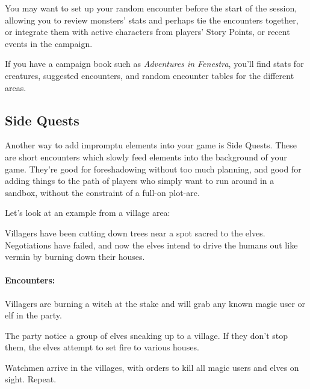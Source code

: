 \begin{multicols}{2}
You may want to set up your random encounter before the start of the session, allowing you to review monsters' stats and perhaps tie the encounters together, or integrate them with active characters from players' Story Points, or recent events in the campaign.

If you have a campaign book such as \textit{Adventures in Fenestra}, you'll find stats for creatures, suggested encounters, and random encounter tables for the different areas.

\subsection{Side Quests}\label{sidequests}

Another way to add impromptu elements into your game is Side Quests.
These are short encounters which slowly feed elements into the background of your game.
They're good for foreshadowing without too much planning, and good for adding things to the path of players who simply want to run around in a sandbox, without the constraint of a full-on plot-arc.

Let's look at an example from a village area:

\begin{exampletext}

	Villagers have been cutting down trees near a spot sacred to the elves.
	Negotiations have failed, and now the elves intend to drive the humans out like vermin by burning down their houses.

\end{exampletext}

\paragraph{Encounters:}

\begin{list}{\Square}{}

\item[\CheckedBox]{Villagers are burning a witch at the stake and will grab any known magic user or elf in the party.}

\item{The party notice a group of elves sneaking up to a village. If they don't stop them, the elves attempt to set fire to various houses.}

\item{Watchmen arrive in the villages, with orders to kill all magic users and elves on sight. Repeat.}


\end{list}
\end{multicols}
